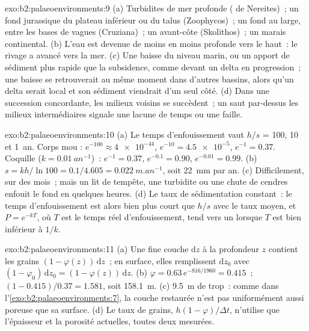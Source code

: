 \begin{solution}{exo:b2:palaeoenvironments:9}
(a) Turbidites de mer profonde ( de Nereites)~; un fond jurassique du plateau inférieur ou du
talus (Zoophycos)~; un fond au large, entre les bases de vagues (Cruziana)~; un avant-côte (Skolithos)~; un
marais continental. (b) L'eau est devenue de moins en moins profonde vers le haut~: le rivage a avancé vers la
mer. (c) Une baisse du niveau marin, ou un apport de sédiment plus rapide que la subsidence, comme devant
un delta en progression~; une baisse se retrouverait au même moment dans d'autres bassins, alors qu'un delta
serait local et son sédiment viendrait d'un seul côté. (d) Dans une succession concordante, les milieux voisins
se succèdent~; un saut par-dessus les milieux intermédiaires signale une lacune de temps ou une faille.
\end{solution}

\begin{solution}{exo:b2:palaeoenvironments:10}
(a) Le temps d'enfouissement vaut $h/s$ = 100, 10 et \qty{1}{an}. Corps mou : $e^{-100} \approx
\num{4e-44}$, $e^{-10} = \num{4.5e-5}$, $e^{-1} = 0.37$. Coquille ($k = \qty{0.01}{an^{-1}}$)~:
$e^{-1} = 0.37$, $e^{-0.1} = 0.90$, $e^{-0.01} = 0.99$. (b) $s = kh/\ln 100 = 0.1/4.605 =
\qty{0.022}{m.an^{-1}}$, soit \qty{22}{mm} par an. (c) Difficilement, sur des mois~; mais un lit de tempête, une
turbidite ou une chute de cendres enfouit le fond en quelques heures. (d) Le taux de sédimentation constant~:
le temps d'enfouissement est alors bien plus court que $h/s$ avec le taux moyen, et $P = e^{-kT}$, où $T$
est le temps réel d'enfouissement, tend vers un lorsque $T$ est bien inférieur à $1/k$.
\end{solution}

\begin{solution}{exo:b2:palaeoenvironments:11}
(a) Une fine couche $\mathrm dz$ à la profondeur $z$ contient les grains $(1 - \varphi(z))\,\mathrm dz$~;
en surface, elles remplissent $\mathrm dz_0$ avec $(1 - \varphi_0)\,\mathrm dz_0 = (1 -
\varphi(z))\,\mathrm dz$. (b) $\varphi = 0.63\,e^{-816/1960} = 0.415$~; $(1 - 0.415)/0.37 =
1.581$, soit \qty{158.1}{m}. (c) \qty{9.5}{m} de trop~: comme dans l'\cref{exo:b2:palaeoenvironments:7},
la couche restaurée n'est pas uniformément aussi poreuse que sa surface. (d) Le taux de grains,
$h(1-\varphi)/\Delta t$, n'utilise que l'épaisseur et la porosité actuelles, toutes deux mesurées.
\end{solution}

